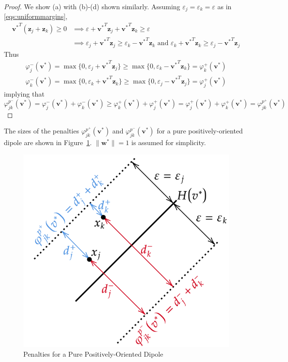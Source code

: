 \documentclass[sn-mathphys]{sn-jnl}%
\theoremstyle{thmstyleone}%
\theoremstyle{thmstyletwo}%
\theoremstyle{thmstylethree}%
\newcommand{\eps}{\varepsilon}
\begin{document}
\begin{proof} We show (a) with (b)-(d) shown similarly. Assuming $\eps_j = \eps_k = \eps$ as in \eqref{eqs:uniformmargins},
\begin{align*}
{\mathbf{v}^{\ast}}^T (\mathbf{z}_j + \mathbf{z}_k) \geq 0 &\implies \eps + {\mathbf{v}^{\ast}}^T \mathbf{z}_j + {\mathbf{v}^{\ast}}^T\mathbf{z}_k \geq \eps \\
 	&\implies \eps_j + {\mathbf{v}^{\ast}}^T \mathbf{z}_j \geq \eps_k - {\mathbf{v}^{\ast}}^T \mathbf{z}_k \text{ and } \eps_k + {\mathbf{v}^{\ast}}^T \mathbf{z}_k \geq \eps_j - {\mathbf{v}^{\ast}}^T \mathbf{z}_j
\end{align*} Thus
\begin{gather*}
\varphi^-_j(\mathbf{v}^{\ast}) = \max\{0, \eps_j + {\mathbf{v}^{\ast}}^T \mathbf{z}_j\} \geq \max\{0, \eps_k - {\mathbf{v}^{\ast}}^T \mathbf{z}_k\} = \varphi^+_k(\mathbf{v}^{\ast}) \\
\varphi^-_k(\mathbf{v}^{\ast}) = \max\{0, \eps_k + {\mathbf{v}^{\ast}}^T \mathbf{z}_k\} \geq \max\{0, \eps_j - {\mathbf{v}^{\ast}}^T \mathbf{z}_j\} = \varphi^+_j(\mathbf{v}^{\ast})
\end{gather*} implying that
$$
\varphi^{p^-}_{jk}(\mathbf{v}^{\ast}) = \varphi^-_j(\mathbf{v}^{\ast}) + \varphi^-_k(\mathbf{v}^{\ast}) \geq \varphi^+_k(\mathbf{v}^{\ast}) + \varphi^+_j(\mathbf{v}^{\ast}) = \varphi^+_j(\mathbf{v}^{\ast}) + \varphi^+_k(\mathbf{v}^{\ast}) = \varphi^{p^+}_{jk}(\mathbf{v}^{\ast})
$$
\end{proof}

The sizes of the penalties $\varphi^{p^+}_{jk}(\mathbf{v}^{\ast})$ and $\varphi^{p^-}_{jk}(\mathbf{v}^{\ast})$ for a pure positively-oriented dipole are shown in Figure~\ref{fig:2}. $\lVert \mathbf{w}^{\ast} \rVert = 1$ is assumed for simplicity.

\begin{figure}[h]
	\centering
        \includegraphics[height=.395\textwidth]{purepositivepenalties}
        \caption{Penalties for a Pure Positively-Oriented Dipole} \label{fig:2}
        \captionsetup{justification=centering}
      \end{figure} 
      
\end{document}
